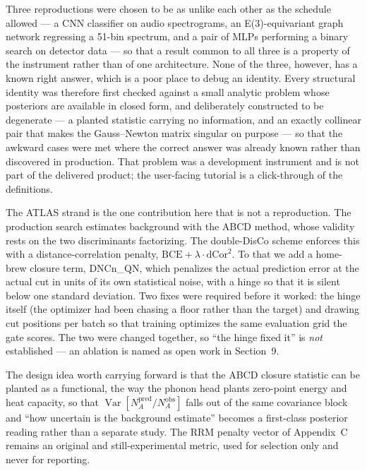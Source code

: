 \documentclass[11pt]{article}
\begin{document}

Three reproductions were chosen to be as unlike each other as the schedule
allowed --- a CNN classifier on audio spectrograms, an E(3)-equivariant graph
network regressing a 51-bin spectrum, and a pair of MLPs performing a binary
search on detector data --- so that a result common to all three is a property
of the instrument rather than of one architecture. None of the three, however,
has a known right answer, which is a poor place to debug an identity. Every
structural identity was therefore first checked against a small analytic problem
whose posteriors are available in closed form, and deliberately constructed to
be degenerate --- a planted statistic carrying no information, and an exactly
collinear pair that makes the Gauss--Newton matrix singular on purpose --- so
that the awkward cases were met where the correct answer was already known
rather than discovered in production. That problem was a development instrument
and is not part of the delivered product; the user-facing tutorial is a
click-through of the definitions.


The ATLAS strand is the one contribution here that is not a reproduction. The
production search estimates background with the ABCD method, whose validity
rests on the two discriminants factorizing. The double-DisCo scheme enforces
this with a distance-correlation penalty, $\mathrm{BCE}+\lambda\!\cdot\!
\mathrm{dCor}^2$. To that we add a home-brew closure term, DNCn\_QN, which
penalizes the actual prediction error at the actual cut in units of its own
statistical noise, with a hinge so that it is silent below one standard
deviation. Two fixes were required before it worked: the hinge itself
(the optimizer had been chasing a floor rather than the target) and drawing
cut positions per batch so that training optimizes the same evaluation grid
the gate scores. The two were changed together, so ``the hinge fixed it'' is
\emph{not} established --- an ablation is named as open work in Section~9.

The design idea worth carrying forward is that the ABCD closure statistic can
be planted as a functional, the way the phonon head plants zero-point energy
and heat capacity, so that $\operatorname{Var}\!\left[N_A^{\mathrm{pred}}/
N_A^{\mathrm{obs}}\right]$ falls out of the same covariance block and ``how
uncertain is the background estimate'' becomes a first-class posterior
reading rather than a separate study. The RRM penalty vector of
Appendix~C remains an original and still-experimental metric, used for
selection only and never for reporting.
\end{document}
